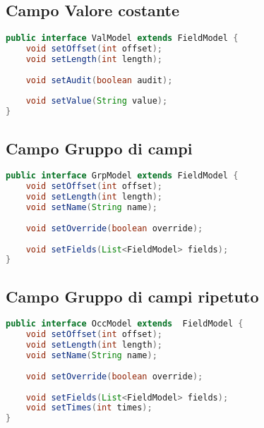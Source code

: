 \documentclass[a4paper,10pt]{report}
\begin{document}
\subsection{Campo Valore costante}

\begin{lstlisting}[language=java, caption=interfaccia ValModel, 
label=code:ValModel]
public interface ValModel extends FieldModel {
    void setOffset(int offset);
    void setLength(int length);
    
    void setAudit(boolean audit);
    
    void setValue(String value);
}
\end{lstlisting}

\subsection{Campo Gruppo di campi}

\begin{lstlisting}[language=java, caption=interfaccia GrpModel, 
label=code:GrpModel]
public interface GrpModel extends FieldModel {
    void setOffset(int offset);
    void setLength(int length);
    void setName(String name);
    
    void setOverride(boolean override);
    
    void setFields(List<FieldModel> fields);
}
\end{lstlisting}

\subsection{Campo Gruppo di campi ripetuto}

\begin{lstlisting}[language=java, caption=interfaccia OccModel, 
label=code:OccModel]
public interface OccModel extends  FieldModel {
    void setOffset(int offset);
    void setLength(int length);
    void setName(String name);
    
    void setOverride(boolean override);
    
    void setFields(List<FieldModel> fields);
    void setTimes(int times);
}
\end{lstlisting}
\end{document}
